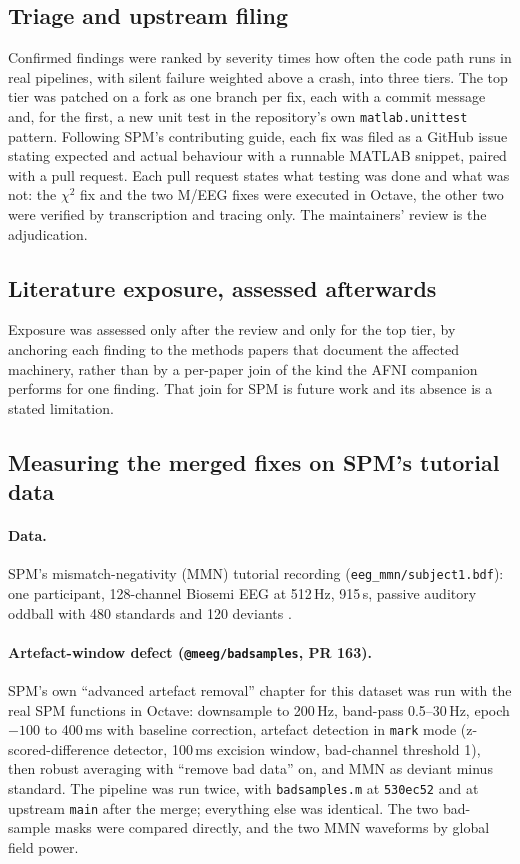 \documentclass[11pt]{article}
\newcommand{\code}[1]{\texttt{#1}}
\begin{document}
\subsection{Triage and upstream filing}
Confirmed findings were ranked by severity times how often the code path runs in real pipelines, with silent failure weighted above a crash, into three tiers. The top tier was patched on a fork as one branch per fix, each with a commit message and, for the first, a new unit test in the repository's own \code{matlab.unittest} pattern. Following SPM's contributing guide, each fix was filed as a GitHub issue stating expected and actual behaviour with a runnable MATLAB snippet, paired with a pull request. Each pull request states what testing was done and what was not: the $\chi^2$ fix and the two M/EEG fixes were executed in Octave, the other two were verified by transcription and tracing only. The maintainers' review is the adjudication.

\subsection{Literature exposure, assessed afterwards}
Exposure was assessed only after the review and only for the top tier, by anchoring each finding to the methods papers that document the affected machinery, rather than by a per-paper join of the kind the AFNI companion performs for one finding. That join for SPM is future work and its absence is a stated limitation.

\subsection{Measuring the merged fixes on SPM's tutorial data}
\label{sec:mmnmethods}
\paragraph{Data.} SPM's mismatch-negativity (MMN) tutorial recording (\code{eeg\_mmn/subject1.bdf}): one participant, 128-channel Biosemi EEG at 512\,Hz, 915\,s, passive auditory oddball with 480 standards and 120 deviants \cite{garrido2007,naatanen2007}.

\paragraph{Artefact-window defect (\code{@meeg/badsamples}, PR 163).} SPM's own ``advanced artefact removal'' chapter for this dataset was run with the real SPM functions in Octave: downsample to 200\,Hz, band-pass 0.5--30\,Hz, epoch $-100$ to 400\,ms with baseline correction, artefact detection in \code{mark} mode (z-scored-difference detector, 100\,ms excision window, bad-channel threshold 1), then robust averaging with ``remove bad data'' on, and MMN as deviant minus standard. The pipeline was run twice, with \code{badsamples.m} at \code{530ec52} and at upstream \code{main} after the merge; everything else was identical. The two bad-sample masks were compared directly, and the two MMN waveforms by global field power.
\end{document}
